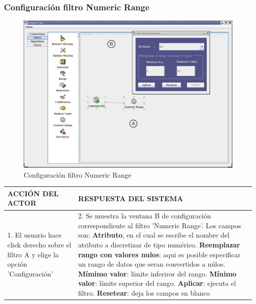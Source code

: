 \subsubsection{Configuraci\'on filtro Numeric Range}
\begin{figure}[ht]
\centering
\includegraphics[width=1\textwidth]{images/fi8.png}
\caption{Configuraci\'on filtro Numeric Range}
\end{figure}
\begin{center}
\begin{tabular}{|p{60mm}|p{60mm}|} \hline

ACCI\'ON DEL ACTOR & RESPUESTA DEL SISTEMA \\ \hline
1. El usuario hace click derecho sobre el filtro A y elige la opci\'on 'Configuraci\'on'& 2. Se muestra la ventana B de configuraci\'on correspondiente al filtro 'Numeric Range'. Los campos son: \textbf{Atributo}, en el cual se escribe el nombre del atributo a discretizar de tipo num\'erico. \textbf{Reemplazar rango con valores nulos}: aqui es posible especificar un rango de datos que seran convertidos a n\'ulos. \textbf{M\'imimo valor}: l\'imite inferiror del rango. \textbf{M\'inimo valor}: l\'imite superior del rango.  \textbf{Aplicar}: ejecuta el filtro. \textbf{Resetear}: deja los campos en blanco  \\ \hline
\end{tabular}
\end{center}

\newpage
